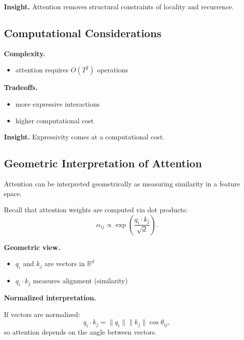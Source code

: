 \medskip

\noindent
\textbf{Insight.}  
Attention removes structural constraints of locality and recurrence.

\subsection{Computational Considerations}

\textbf{Complexity.}

\begin{itemize}
    \item attention requires $O(T^2)$ operations
\end{itemize}

\medskip

\noindent
\textbf{Tradeoffs.}

\begin{itemize}
    \item more expressive interactions
    \item higher computational cost
\end{itemize}

\medskip

\noindent
\textbf{Insight.}  
Expressivity comes at a computational cost.

\subsection{Geometric Interpretation of Attention}

Attention can be interpreted geometrically as measuring similarity in a feature space.

\medskip

\noindent
Recall that attention weights are computed via dot products:
\[
\alpha_{ij} \propto \exp\left( \frac{q_i \cdot k_j}{\sqrt{d}} \right).
\]

\medskip

\noindent
\textbf{Geometric view.}

\begin{itemize}
    \item $q_i$ and $k_j$ are vectors in $\mathbb{R}^d$
    \item $q_i \cdot k_j$ measures alignment (similarity)
\end{itemize}

\medskip

\noindent
\textbf{Normalized interpretation.}

If vectors are normalized:
\[
q_i \cdot k_j = \|q_i\|\|k_j\|\cos\theta_{ij},
\]
so attention depends on the angle between vectors.

